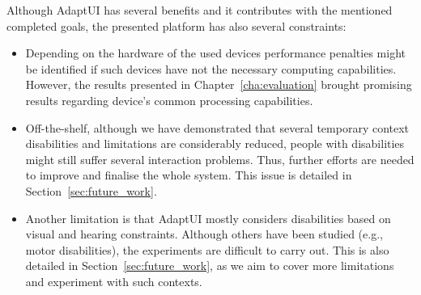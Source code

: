 Although AdaptUI has several benefits and it contributes with the mentioned 
completed goals, the presented platform has also several constraints:

\begin{itemize}
  \item Depending on the hardware of the used devices performance penalties might
  be identified if such devices have not the necessary computing capabilities.
  However, the results presented in Chapter~\ref{cha:evaluation} brought promising 
  results regarding device's common processing capabilities.
  
  \item Off-the-shelf, although we have demonstrated that several temporary context 
  disabilities and limitations are considerably reduced, people with 
  disabilities might still suffer several interaction problems. Thus, further 
  efforts are needed to improve and finalise the whole system. This issue is 
  detailed in Section~\ref{sec:future_work}.
  
  \item Another limitation is that AdaptUI mostly considers disabilities based
  on visual and hearing constraints. Although others have been studied (e.g., motor
  disabilities), the experiments are difficult to carry out. This is also 
  detailed in Section~\ref{sec:future_work}, as we aim to cover more limitations 
  and experiment with such contexts.
\end{itemize}